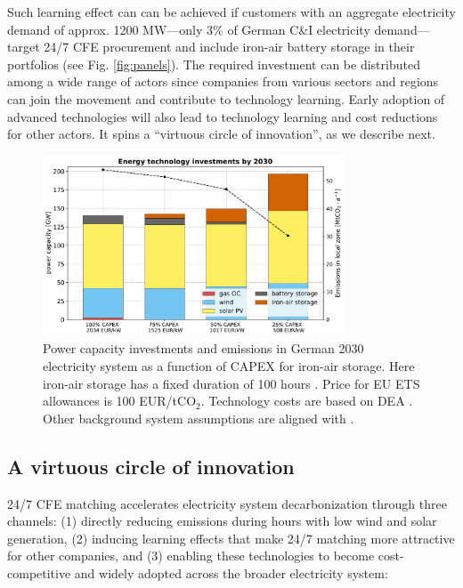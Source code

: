 \documentclass[pdflatex,sn-basic, Numbered]{sn-jnl}
\theoremstyle{thmstyleone}%
\theoremstyle{thmstyletwo}%
\theoremstyle{thmstylethree}%
\begin{document}
Such learning effect can can be achieved if customers with an aggregate electricity demand of approx. 1200 MW---only 3\% of German C\&I electricity demand---target 24/7 CFE procurement and include iron-air battery storage in their portfolios (see Fig. \ref{fig:panels}). The required investment can be distributed among a wide range of actors since companies from various sectors and regions can join the movement and contribute to technology learning.
Early adoption of advanced technologies will also lead to technology learning and cost reductions for other actors. It spins a \enquote{virtuous circle of innovation}, as we describe next.

\begin{figure}[htbp]
    \centering
    \includegraphics[width=0.8\textwidth]{images/dashboard_3.pdf}
    \caption{Power capacity investments and emissions in German 2030 electricity system as a function of CAPEX for iron-air storage. Here iron-air storage has a fixed duration of 100 hours \cite{FormEnergyLatest2024}. Price for EU ETS allowances is 100 EUR/tCO$_2$. Technology costs are based on DEA \cite{DEA-technologydata}. Other background system assumptions are aligned with \citet{riepinMeansCostsSystemlevel2024}.}\label{fig:impact}
\end{figure}

\subsection*{A virtuous circle of innovation}\label{sec5}

24/7 CFE matching accelerates electricity system decarbonization through three channels: (1) directly reducing emissions during hours with low wind and solar generation, (2) inducing learning effects that make 24/7 matching more attractive for other companies, and (3) enabling these technologies to become cost-competitive and widely adopted across the broader electricity system:
\end{document}
